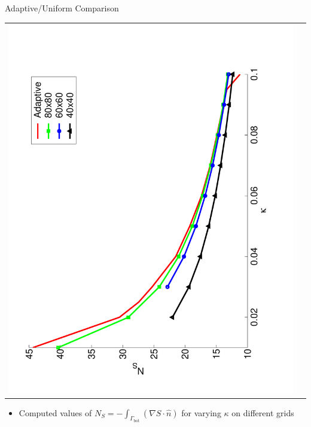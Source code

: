 \documentclass[compress,12pt]{beamer}
\begin{document}
\begin{frame}{Adaptive/Uniform Comparison}
\begin{center}
  \begin{tabular}{cc} \\
	\includegraphics[angle=-90,width=.75\textwidth]{figures/Nu_vs_kappa}
      \end{tabular}
\end{center}
\vspace{-.5in}
      \begin{itemize}
      \item Computed values of $N_S = -\int_{\Gamma_{\text{bot}}}\left(\nabla S \cdot \hat{n}\right) $
	for varying $\kappa$ on different grids
      \end{itemize}
\end{frame}
\end{document}
